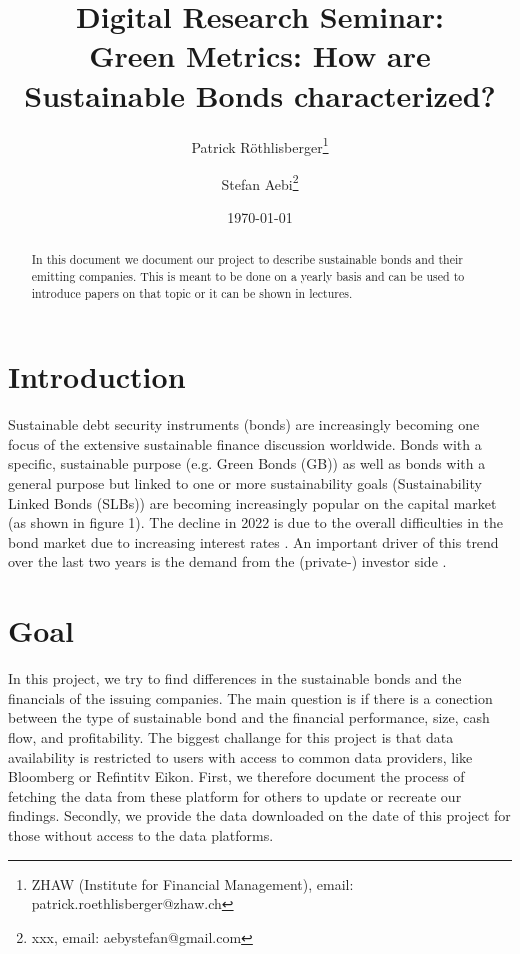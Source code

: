 \documentclass[12pt, a4paper]{article}
\begin{document}
\title{Digital Research Seminar: \\ Green Metrics: How are Sustainable Bonds characterized?}
\author{
    Patrick Röthlisberger\thanks{ZHAW (Institute for Financial Management), email: patrick.roethlisberger@zhaw.ch}
    \and
    Stefan Aebi\thanks{xxx, email: aebystefan@gmail.com}
    }
\date{\today} %
\maketitle

\begin{abstract}
In this document we document our project to describe sustainable bonds and their emitting companies. This is meant to be done on a yearly basis and can be used to introduce papers on that topic or it can be shown in lectures.
\end{abstract}
\newpage
\tableofcontents
\newpage
\section{Introduction}
Sustainable debt security instruments (bonds) are increasingly becoming one focus of the extensive sustainable finance discussion worldwide. Bonds with a specific, sustainable purpose (e.g. Green Bonds (GB)) as well as bonds with a general purpose but linked to one or more sustainability goals (Sustainability Linked Bonds (SLBs)) are becoming increasingly popular on the capital market (as shown in figure 1). The decline in 2022 is due to the overall difficulties in the bond market due to increasing interest rates \citep{Sgrue2023sustainable-bond-issuance}. An important driver of this trend over the last two years is the demand from the (private-) investor side \citep{pietschPricingGreenBonds2022}.

\section{Goal}
In this project, we try to find differences in the sustainable bonds and the financials of the issuing companies. The main question is if there is a conection between the type of sustainable bond and the financial performance, size, cash flow, and profitability. The biggest challange for this project is that data availability is restricted to users with access to common data providers, like Bloomberg or Refintitv Eikon. First, we therefore document the process of fetching the data from these platform for others to update or recreate our findings. Secondly, we provide the data downloaded on the date of this project for those without access to the data platforms.
\end{document}
